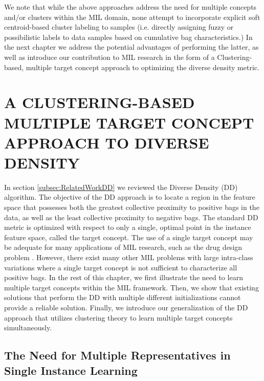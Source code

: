 \documentclass[12pt,dvips]{report}
\numberwithin{equation}{section}
\begin{document}
We note that while the above approaches address the need for multiple concepts and/or clusters within the MIL domain, none attempt to incorporate explicit soft centroid-based cluster labeling to samples (i.e. directly assigning fuzzy or possibilistic labels to data samples based on cumulative bag characteristics.)  In the next chapter we address the potential advantages of performing the latter, as well as introduce our contribution to MIL research in the form of a Clustering-based, multiple target concept approach to optimizing the diverse density metric.



\chapter{A CLUSTERING-BASED MULTIPLE TARGET CONCEPT APPROACH TO DIVERSE DENSITY} \label{chapter:MDD}
In section \ref{subsec:RelatedWorkDD} we reviewed the Diverse Density (DD) algorithm. The objective of the DD approach is to locate a region in the
feature space that possesses both the greatest collective proximity
to positive bags in the data, as well as the least collective
proximity to negative bags. The standard DD metric
is optimized with respect to only a single, optimal point in the instance
feature space, called the target concept. The use
of a single target concept may be adequate for many applications
of MIL research, such as the drug design problem \cite{diet97}. However,
there exist many other MIL problems with large intra-class variations where
a single target concept is not sufficient to characterize all positive bags.   In the rest of this chapter,
we first illustrate the need to learn multiple target concepts within
the MIL framework. Then, we show that existing solutions that perform the DD with multiple different initializations
cannot provide a reliable solution.
Finally, we introduce our generalization of the DD approach that utilizes clustering theory to learn
multiple target concepts simultaneously. 

\section{The Need for Multiple Representatives in Single Instance Learning}
\end{document}
